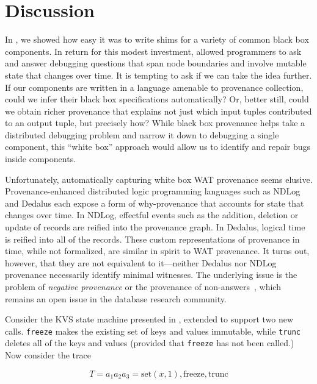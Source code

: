 \section{Discussion}
In , we showed how easy it was to write shims for a
variety of common black box components.  In return for this modest investment,
\fluent{}  allowed programmers to ask and answer debugging questions that span
node boundaries and involve mutable state that changes over time.  It is
tempting to ask if we can take the idea further.  If our components are written
in a language amenable to provenance collection, could we infer their black box
specifications automatically?  Or, better still, could we obtain richer
provenance that explains not just which input tuples contributed to an output
tuple, but precisely how?  While black box provenance helps take a distributed
debugging problem and narrow it down to debugging a single component, this
``white box'' approach would allow us to identify and repair bugs inside
components.

Unfortunately, automatically capturing white box WAT provenance seems elusive.
Provenance-enhanced distributed logic programming languages such as NDLog and
Dedalus each expose a form of why-provenance that accounts for state that
changes over time.  In NDLog, effectful events such as the addition, deletion
or update of records are reified into the provenance graph.  In Dedalus,
logical time is reified into all of the records.  These custom representations
of provenance in time, while not formalized, are similar in spirit to WAT
provenance.  It turns out, however, that they are not equivalent to
it---neither Dedalus nor NDLog provenance necessarily identify minimal
witnesses.  The underlying issue is the problem of \emph{negative provenance}
or the provenance of non-answers~\cite{chapman2009whynot,huang2008nonanswers},
which remains an open issue in the database research community.

\newcommand{\kvset}{\text{set}}
\newcommand{\kvget}{\text{get}}
\newcommand{\freeze}{\text{freeze}}
\newcommand{\trunc}{\text{trunc}}

Consider the KVS state machine presented in ,
extended to support two new calls.   \texttt{freeze} makes the existing set of
keys and values immutable, while \texttt{trunc} deletes all of the keys and
values (provided that \texttt{freeze} has not been called.)  Now consider the
trace

\[
  T = a_1 a_2 a_3 = \kvset(x,1), \freeze, \trunc
\]

